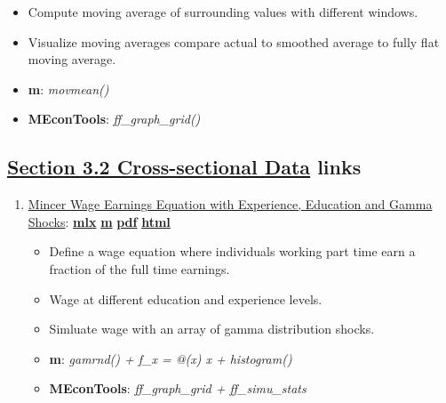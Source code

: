 \documentclass[
]{book}
\providecommand{\tightlist}{%
  \setlength{\itemsep}{0pt}\setlength{\parskip}{0pt}}
\begin{document}
\begin{enumerate}
  \begin{itemize}
  \tightlist
  \item
    Compute moving average of surrounding values with different windows.
  \item
    Visualize moving averages compare actual to smoothed average to fully flat moving average.
  \item
    \textbf{m}: \emph{movmean()}
  \item
    \textbf{MEconTools}: \emph{ff\_graph\_grid()}
  \end{itemize}
\end{enumerate}

\hypertarget{section-3.2-cross-sectional-datacross-sectional-data-links}{%
\subsection{\texorpdfstring{\protect\hyperlink{cross-sectional-data}{Section 3.2 Cross-sectional Data} links}{Section 3.2 Cross-sectional Data links}}\label{section-3.2-cross-sectional-datacross-sectional-data-links}}

\begin{enumerate}
\def\labelenumi{\arabic{enumi}.}
\tightlist
\item
  \href{https://fanwangecon.github.io/M4Econ/panel/crosssection/htmlpdfm/fs_wage_equation.html}{Mincer Wage Earnings Equation with Experience, Education and Gamma Shocks}: \href{https://github.com/FanWangEcon/M4Econ/blob/master/panel/crosssection/fs_wage_equation.mlx}{\textbf{mlx}} \textbar{} \href{https://github.com/FanWangEcon/M4Econ/blob/master/panel/crosssection/htmlpdfm/fs_wage_equation.m}{\textbf{m}} \textbar{} \href{https://github.com/FanWangEcon/M4Econ/blob/master/panel/crosssection/htmlpdfm/fs_wage_equation.pdf}{\textbf{pdf}} \textbar{} \href{https://fanwangecon.github.io/M4Econ/panel/crosssection/htmlpdfm/fs_wage_equation.html}{\textbf{html}}

  \begin{itemize}
  \tightlist
  \item
    Define a wage equation where individuals working part time earn a fraction of the full time earnings.
  \item
    Wage at different education and experience levels.
  \item
    Simluate wage with an array of gamma distribution shocks.
  \item
    \textbf{m}: \emph{gamrnd() + f\_x = @(x) x + histogram()}
  \item
    \textbf{MEconTools}: \emph{ff\_graph\_grid + ff\_simu\_stats}
  \end{itemize}
\end{enumerate}
\end{document}
